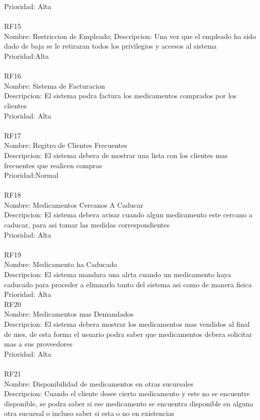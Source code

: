 Prioridad: Alta\\
\\
RF15\\
Nombre: Restriccion de Empleado;
Descripcion: Una vez que el empleado ha sido dado de baja se le retiraran todos los privilegios y accesos al sistema\\
Prioridad:Alta\\
\\
RF16\\
Nombre: Sistema de Facturacion\\
Descripcion: El sistema podra factura los medicamentos comprados por los clientes\\
Prioridad: Alta\\
\\ 
RF17\\
Nombre: Regitro de Clientes Frecuentes\\
Descripcion: El sistema debera de mostrar una lista con los clientes mas frecuentes que realicen compras\\
Prioridad:Normal\\
\\
RF18\\
Nombre: Medicamentos Cercanos A Caducar\\
Descripcion: El sistema debera avisar cuando algun medicamento este cercano a caducar, para asi tomar las medidas correspondientes\\
Prioridad: Alta\\
\\
RF19\\
Nombre: Medicamento ha Caducado\\
Descripcion: El sistema mandara una alrta cuando un medicamento haya caducado para proceder a elimnarlo tanto del sistema asi como de manera fisica\\
Prioridad: Alta\\
\newpage
RF20\\
Nombre: Medicamentos mas Demandados\\
Descripcion: El sistema debera mostrar los medicamentos mas vendidos al final de mes, de esta forma el usuario podra saber que medicamentos debera solicitar mas a sus proveedores\\
Prioridad: Alta\\
\\
RF21\\
Nombre: Disponibilidad de medicamentos en otras sucursales\\
Descripcion: Cuando el cliente desee cierto medicamento y este no se encuentre disponible, se podra saber si ese medicamento se encuentra disponible en alguna otra sucursal o incluso saber si esta o no en existencias\\
